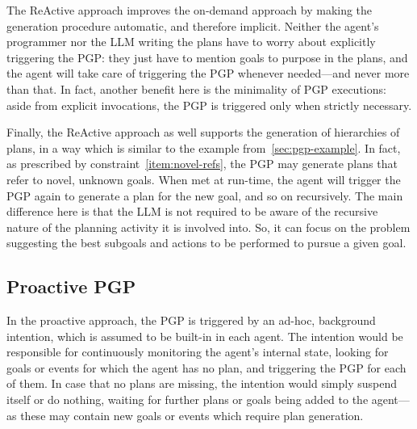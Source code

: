 \documentclass[12pt,a4paper,openright,twoside]{book}
\begin{document}
The \ac{ReAct}ive approach improves the on-demand approach by making the generation procedure automatic, and therefore implicit.
%
Neither the agent's programmer nor the \ac{LLM} writing the plans have to worry about explicitly triggering the \ac{PGP}: they just have to mention goals to purpose in the plans, and the agent will take care of triggering the \ac{PGP} whenever needed---and never more than that.
%
In fact, another benefit here is the minimality of \ac{PGP} executions: aside from explicit invocations, the \ac{PGP} is triggered only when strictly necessary.

Finally, the \ac{ReAct}ive approach as well supports the generation of hierarchies of plans, in a way which is similar to the example from~\ref{sec:pgp-example}.
%
In fact, as prescribed by constraint~\ref{item:novel-refs}, the \ac{PGP} may generate plans that refer to novel, unknown goals.
%
When met at run-time, the agent will trigger the \ac{PGP} again to generate a plan for the new goal, and so on recursively.
%
The main difference here is that the \ac{LLM} is not required to be aware of the recursive nature of the planning activity it is involved into.
%
So, it can focus on the problem suggesting the best subgoals and actions to be performed to pursue a given goal.

\subsection{Proactive \acs{PGP}}

In the proactive approach, the \ac{PGP} is triggered by an ad-hoc, background intention, which is assumed to be built-in in each agent.
%
The intention would be responsible for continuously monitoring the agent's internal state, looking for goals or events for which the agent has no plan, and triggering the \ac{PGP} for each of them.
%
In case that no plans are missing, the intention would simply suspend itself or do nothing, waiting for further plans or goals being added to the agent---as these may contain new goals or events which require plan generation.
\end{document}
